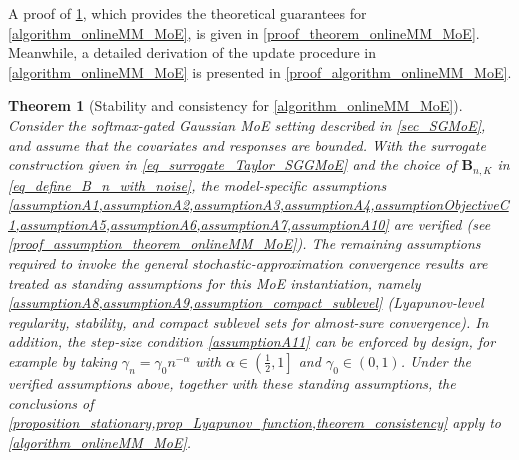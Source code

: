 \documentclass{article}
\newtheorem{theorem}{Theorem}
\def\mB{{\bm{B}}}
\begin{document}
A proof of \cref{theorem_onlineMM_MoE}, which provides the theoretical guarantees for \cref{algorithm_onlineMM_MoE}, is given in \cref{proof_theorem_onlineMM_MoE}. Meanwhile, a detailed derivation of the update procedure in \cref{algorithm_onlineMM_MoE} is presented in \cref{proof_algorithm_onlineMM_MoE}.

\begin{theorem}[Stability and consistency for \cref{algorithm_onlineMM_MoE}]
\label{theorem_onlineMM_MoE}
Consider the softmax-gated Gaussian MoE setting described in \cref{sec_SGMoE}, and assume that the
covariates and responses are bounded.
With the surrogate construction given in \cref{eq_surrogate_Taylor_SGGMoE} and the choice of
$\mB_{n,K}$ in \cref{eq_define_B_n_with_noise}, the model-specific assumptions
\cref{assumptionA1,assumptionA2,assumptionA3,assumptionA4,assumptionObjectiveC1,assumptionA5,assumptionA6,assumptionA7,assumptionA10}
are \emph{verified} (see \cref{proof_assumption_theorem_onlineMM_MoE}).
The remaining assumptions required to invoke the general stochastic-approximation convergence results are
treated as \emph{standing assumptions} for this MoE instantiation, namely
\cref{assumptionA8,assumptionA9,assumption_compact_sublevel}
(Lyapunov-level regularity, stability, and compact sublevel sets for almost-sure convergence).
In addition, the step-size condition \cref{assumptionA11} can be \emph{enforced by design},
for example by taking $\gamma_n=\gamma_0 n^{-\alpha}$ with $\alpha\in\left(\tfrac12,1\right]$
and $\gamma_0\in(0,1)$.
Under the verified assumptions above, together with these standing assumptions,
the conclusions of
\cref{proposition_stationary,prop_Lyapunov_function,theorem_consistency}
apply to \cref{algorithm_onlineMM_MoE}.
\end{theorem}
\end{document}
